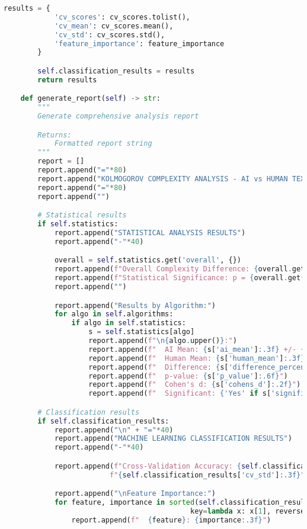 \documentclass[12pt,a4paper]{report}
\begin{document}
\begin{lstlisting}[language=Python, caption=Complete Compression Analysis Framework]
        results = {
            'cv_scores': cv_scores.tolist(),
            'cv_mean': cv_scores.mean(),
            'cv_std': cv_scores.std(),
            'feature_importance': feature_importance
        }

        self.classification_results = results
        return results

    def generate_report(self) -> str:
        """
        Generate comprehensive analysis report

        Returns:
            Formatted report string
        """
        report = []
        report.append("="*80)
        report.append("KOLMOGOROV COMPLEXITY ANALYSIS - AI vs HUMAN TEXT DETECTION")
        report.append("="*80)
        report.append("")

        # Statistical results
        if self.statistics:
            report.append("STATISTICAL ANALYSIS RESULTS")
            report.append("-"*40)

            overall = self.statistics.get('overall', {})
            report.append(f"Overall Complexity Difference: {overall.get('difference_percent', 0):.1f}%")
            report.append(f"Statistical Significance: p = {overall.get('p_value', 1):.6f}")
            report.append("")

            report.append("Results by Algorithm:")
            for algo in self.algorithms:
                if algo in self.statistics:
                    s = self.statistics[algo]
                    report.append(f"\n{algo.upper()}:")
                    report.append(f"  AI Mean: {s['ai_mean']:.3f} +/- {s['ai_std']:.3f}")
                    report.append(f"  Human Mean: {s['human_mean']:.3f} +/- {s['human_std']:.3f}")
                    report.append(f"  Difference: {s['difference_percent']:.1f}%")
                    report.append(f"  p-value: {s['p_value']:.6f}")
                    report.append(f"  Cohen's d: {s['cohens_d']:.2f}")
                    report.append(f"  Significant: {'Yes' if s['significant'] else 'No'}")

        # Classification results
        if self.classification_results:
            report.append("\n" + "="*40)
            report.append("MACHINE LEARNING CLASSIFICATION RESULTS")
            report.append("-"*40)

            report.append(f"Cross-Validation Accuracy: {self.classification_results['cv_mean']:.3f} +/- "
                         f"{self.classification_results['cv_std']:.3f}")

            report.append("\nFeature Importance:")
            for feature, importance in sorted(self.classification_results['feature_importance'].items(),
                                            key=lambda x: x[1], reverse=True):
                report.append(f"  {feature}: {importance:.3f}")


\end{lstlisting}
\end{document}
